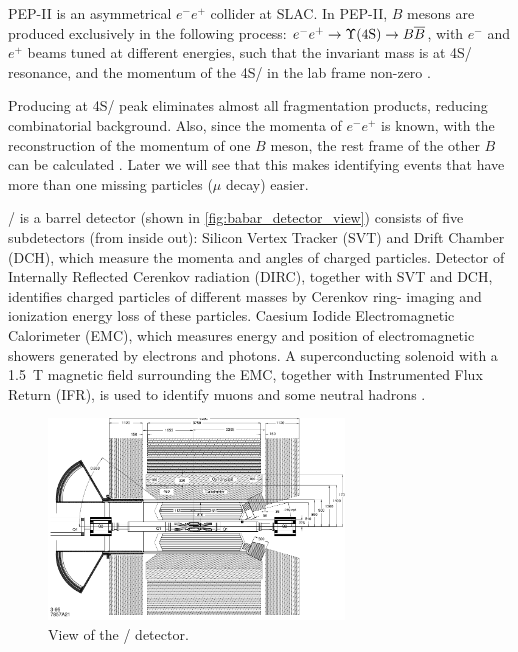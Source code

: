 PEP-II is an asymmetrical $e^- e^+$ collider at SLAC.
In PEP-II, $B$ mesons are produced exclusively in the following process:
$e^- e^+ \rightarrow \Y4S/ \rightarrow B \overline{B}$, with 
$e^-$ and $e^+$ beams tuned at different energies,
such that the invariant mass is at \Y4S/ resonance,
and the momentum of the \Y4S/ in the lab frame
non-zero \cite{Harrison:1998yr}.

Producing at \Y4S/ peak eliminates almost all fragmentation products, reducing combinatorial
background.
Also, since the momenta of $e^- e^+$ is known, with the reconstruction of the
momentum of one $B$ meson, the rest frame of the other $B$ can 
be calculated \cite{Harrison:1998yr}.
Later we will see that this makes identifying events that have more than one missing particles
($\mu$ decay) easier.

\BaBar/ is a barrel detector (shown in \autoref{fig:babar_detector_view})
consists of five subdetectors (from inside out):
Silicon Vertex Tracker (SVT) and Drift Chamber (DCH), which measure the momenta
and angles of charged particles.
Detector of Internally Reflected Cerenkov radiation (DIRC), together with SVT
and DCH, identifies charged particles of different masses by Cerenkov ring-
imaging and ionization energy loss of these particles.
Caesium Iodide Electromagnetic Calorimeter (EMC), which measures energy and
position of electromagnetic showers generated by electrons and photons.
A superconducting solenoid with a \SI{1.5}{T} magnetic field surrounding the
EMC, together with Instrumented Flux Return (IFR), is used to identify muons and
some neutral hadrons \cite{Lees:2013uzd}.

\begin{figure}[ht]
    \centering
    \includegraphics[width=0.7\textwidth]{figs/babar_detector_view.pdf}
    \caption{
        View of the \BaBar/ detector.
    }
    \label{fig:babar_detector_view}
\end{figure}

